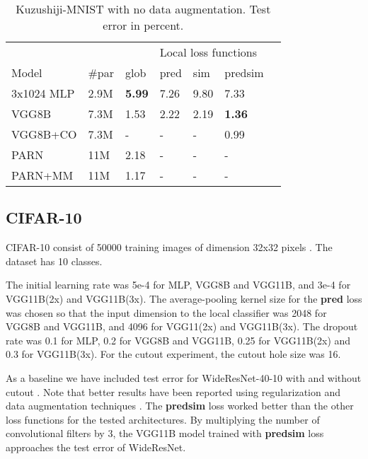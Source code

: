 \documentclass{article}
\begin{document}
\begin{table}[h]
  \caption{Kuzushiji-MNIST with no data augmentation. Test error in percent.}
  \label{table:kmnist}
  \centering
  \begin{tabular}{lllllll}
    \toprule
    &&& \multicolumn{3}{|l}{Local loss functions} \\
    Model   & \#par & glob & \multicolumn{1}{|l}{pred} & sim & \multicolumn{1}{l}{predsim}  \\
    \midrule
    3x1024 MLP & 2.9M &  \textbf{5.99} & \multicolumn{1}{|l}{7.26} & 9.80  & 7.33 \\
    VGG8B      & 7.3M &  1.53 & \multicolumn{1}{|l}{2.22} & 2.19  & \textbf{1.36} \\
    VGG8B+CO   & 7.3M &  - & \multicolumn{1}{|l}{-} & -  & 0.99 \\
    \midrule
    PARN       & 11M & 2.18  & \multicolumn{1}{|l}{-} & - & - \\
    PARN+MM    & 11M & 1.17  & \multicolumn{1}{|l}{-} & - & - \\
    \bottomrule
  \end{tabular}
\end{table}

\subsection{CIFAR-10}

CIFAR-10 consist of 50000 training images of dimension 32x32 pixels \cite{Krizhevsky09}. The dataset has 10 classes.

The initial learning rate was 5e-4 for MLP, VGG8B and VGG11B, and 3e-4 for VGG11B(2x) and VGG11B(3x). The average-pooling kernel size for the \textbf{pred} loss was chosen so that the input dimension to the local classifier was 2048 for VGG8B and VGG11B, and 4096 for VGG11(2x) and VGG11B(3x). The dropout rate was 0.1 for MLP, 0.2 for VGG8B and VGG11B, 0.25 for VGG11B(2x) and 0.3 for VGG11B(3x). For the cutout experiment, the cutout hole size was 16.

As a baseline we have included test error for WideResNet-40-10 with and without cutout \cite{DevriesT17}. Note that better results have been reported using regularization and data augmentation techniques  \cite{VermaLBNCMB18,CubukZMVL18}. The \textbf{predsim} loss worked better than the other loss functions for the tested architectures. By multiplying the number of convolutional filters by 3, the VGG11B model trained with \textbf{predsim} loss approaches the test error of WideResNet.
\end{document}

